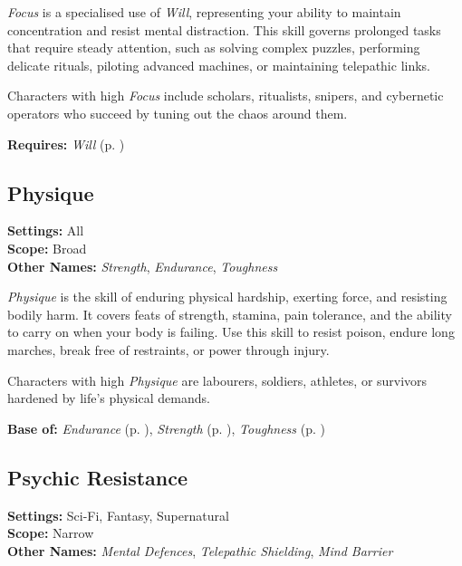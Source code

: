 \emph{Focus} is a specialised use of \emph{Will}, representing your ability to maintain concentration and resist mental distraction. This skill governs prolonged tasks that require steady attention, such as solving complex puzzles, performing delicate rituals, piloting advanced machines, or maintaining telepathic links.

Characters with high \emph{Focus} include scholars, ritualists, snipers, and cybernetic operators who succeed by tuning out the chaos around them.

\vspace{0.5\baselineskip}
\noindent\textbf{Requires:} \emph{Will} (p. \pageref{skill:will})






\subsection{Physique}\label{skill:physique}
\textbf{Settings:} All\\
\textbf{Scope:} Broad\\
\textbf{Other Names:} \emph{Strength}, \emph{Endurance}, \emph{Toughness}\\
\vspace{\baselineskip}

\emph{Physique} is the skill of enduring physical hardship, exerting force, and resisting bodily harm. It covers feats of strength, stamina, pain tolerance, and the ability to carry on when your body is failing. Use this skill to resist poison, endure long marches, break free of restraints, or power through injury.

Characters with high \emph{Physique} are labourers, soldiers, athletes, or survivors hardened by life’s physical demands.

\vspace{0.5\baselineskip}
\noindent\textbf{Base of:} \emph{Endurance} (p. \pageref{skill:endurance}), \emph{Strength} (p. \pageref{skill:strength}), \emph{Toughness} (p. \pageref{skill:toughness})



\subsection{Psychic Resistance}\label{skill:psychic-resistance}
\textbf{Settings:} Sci-Fi, Fantasy, Supernatural\\
\textbf{Scope:} Narrow\\
\textbf{Other Names:} \emph{Mental Defences}, \emph{Telepathic Shielding}, \emph{Mind Barrier}\\
\vspace{\baselineskip}


